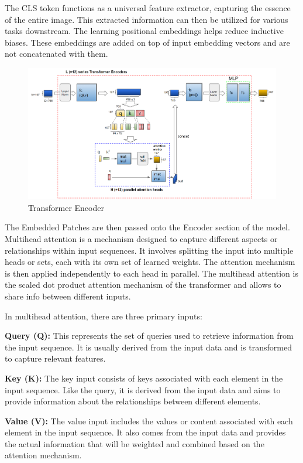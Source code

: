 \noindent The CLS token functions as a universal feature extractor, capturing the essence of the entire image. This extracted information can then be utilized for various tasks downstream. The learning positional embeddings helps reduce inductive biases. These embeddings are added on top of input embedding vectors and are not concatenated with them.

\begin{figure}[htbp]
    \centering
    \includegraphics[width=6.3in]{img/transformer_encoder.png}
    \caption{{Transformer Encoder}}
\end{figure}
\noindent The Embedded Patches are then passed onto the Encoder section of the model. Multihead attention is a mechanism designed to capture different aspects or relationships within input sequences. It involves splitting the input into multiple heads or sets, each with its own set of learned weights. The attention mechanism is then applied independently to each head in parallel. The multihead attention is the scaled dot product attention mechanism of the transformer and allows to share info between different inputs.

\noindent In multihead attention, there are three primary inputs:

\textbf{Query (Q):} This represents the set of queries used to retrieve information from the input sequence. It is usually derived from the input data and is transformed to capture relevant features.

\textbf{Key (K):} The key input consists of keys associated with each element in the input sequence. Like the query, it is derived from the input data and aims to provide information about the relationships between different elements.

\textbf{Value (V):} The value input includes the values or content associated with each element in the input sequence. It also comes from the input data and provides the actual information that will be weighted and combined based on the attention mechanism.

